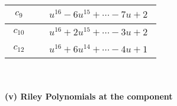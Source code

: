 \documentclass[1p]{elsarticle_modified}
\theoremstyle{definition}
\begin{document}
\begin{tabular}{m{50pt}|m{274pt}}
\hline $$\begin{aligned}c_{9}\end{aligned}$$&$\begin{aligned}
&u^{16}-6 u^{15}+\cdots-7 u+2
\end{aligned}$\\
\hline $$\begin{aligned}c_{10}\end{aligned}$$&$\begin{aligned}
&u^{16}+2 u^{15}+\cdots-3 u+2
\end{aligned}$\\
\hline $$\begin{aligned}c_{12}\end{aligned}$$&$\begin{aligned}
&u^{16}+6 u^{14}+\cdots-4 u+1
\end{aligned}$\\
\hline
\end{tabular}\\~\\
\newpage\renewcommand{\arraystretch}{1}
\flushleft \textbf{(v) Riley Polynomials at the component}\newline \\
\end{document}
